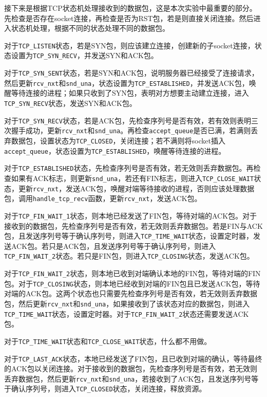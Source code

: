 \documentclass[UTF8]{report}
\begin{document}
接下来是根据TCP状态机处理接收到的数据包，这是本次实验中最重要的部分。先检查是否存在socket连接，再检查是否为RST包，若是则直接关闭连接。然后进入状态机处理，根据不同的状态处理不同的数据包。

对于\texttt{TCP_LISTEN}状态，若是SYN包，则应该建立连接，创建新的子socket连接，状态设置为\texttt{TCP_SYN_RECV}，并发送SYN和ACK包。

对于\texttt{TCP_SYN_SENT}状态，若是SYN和ACK包，说明服务器已经接受了连接请求，然后更新\texttt{rcv_nxt}和\texttt{snd_una}，状态设置为\texttt{TCP_ESTABLISHED}，并发送ACK包，唤醒等待连接的进程；如果只收到了SYN包，表明对方想要主动建立连接，进入\texttt{TCP_SYN_RECV}状态，发送SYN和ACK包。

对于\texttt{TCP_SYN_RECV}状态，若是ACK包，先检查序列号是否有效，若有效则表明三次握手成功，更新\texttt{rcv_nxt}和\texttt{snd_una}。再检查\texttt{accept_queue}是否已满，若满则丢弃数据包，设置状态为\texttt{TCP_CLOSED}，关闭连接；若不满则将socket插入\texttt{accept_queue}，状态设置为\texttt{TCP_ESTABLISHED}，唤醒等待连接的进程。

对于\texttt{TCP_ESTABLISHED}状态，先检查序列号是否有效，若无效则丢弃数据包。再检查如果有ACK标志，则更新\texttt{snd_una}，若还有FIN标志，则进入\texttt{TCP_CLOSE_WAIT}状态，更新\texttt{rcv_nxt}，发送ACK包，唤醒对端等待接收的进程，否则应该处理数据包，调用\texttt{handle_tcp_recv}函数，更新\texttt{rcv_nxt}，发送ACK包。

对于\texttt{TCP_FIN_WAIT_1}状态，则本地已经发送了FIN包，等待对端的ACK包。对于接收到的数据包，先检查序列号是否有效，若无效则丢弃数据包。若是FIN与ACK包，且发送序列号等于确认序列号，则进入\texttt{TCP_TIME_WAIT}状态，设置定时器，发送ACK包。若只是ACK包，且发送序列号等于确认序列号，则进入\texttt{TCP_FIN_WAIT_2}状态。若只是FIN包，则进入\texttt{TCP_CLOSING}状态，发送ACK包。

对于\texttt{TCP_FIN_WAIT_2}状态，则本地已收到对端确认本地的FIN包，等待对端的FIN包。对于\texttt{TCP_CLOSING}状态，则本地已经收到对端的FIN包且已发送ACK包，等待对端的ACK包。这两个状态也只需要先检查序列号是否有效，若无效则丢弃数据包，然后更新\texttt{rcv_nxt}和\texttt{snd_una}，如果接收到了该状态对应的数据包，则进入\texttt{TCP_TIME_WAIT}状态，设置定时器。对于\texttt{TCP_FIN_WAIT_2}状态还需要发送ACK包。

对于\texttt{TCP_TIME_WAIT}状态和\texttt{TCP_CLOSE_WAIT}状态，什么都不用做。

对于\texttt{TCP_LAST_ACK}状态，本地已经发送了FIN包，且已收到对端的确认，等待最终的ACK包以关闭连接。对于接收到的数据包，先检查序列号是否有效，若无效则丢弃数据包，然后更新\texttt{rcv_nxt}和\texttt{snd_una}，若接收到了ACK包，且发送序列号等于确认序列号，则进入\texttt{TCP_CLOSED}状态，关闭连接，释放资源。
\end{document}
